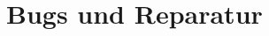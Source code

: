 \chapter{Bugs und Reparatur}
\label{ch:bugsundreparatur}

\newcommand{\bug}[3]{\textbf{\arabic{cnr}}\addtocounter{cnr}{1}. & \textbf{Fehlersymptom:} & #1 \\ & \textbf{Fehlergrund:} & #2 \\ & \textbf{Fehlerbehebung:} & #3 \\ [1ex] }

\setcounter{cnr}{1}

\begin{longtable}{llp{0.8\linewidth}}
	
	
	
\end{longtable}